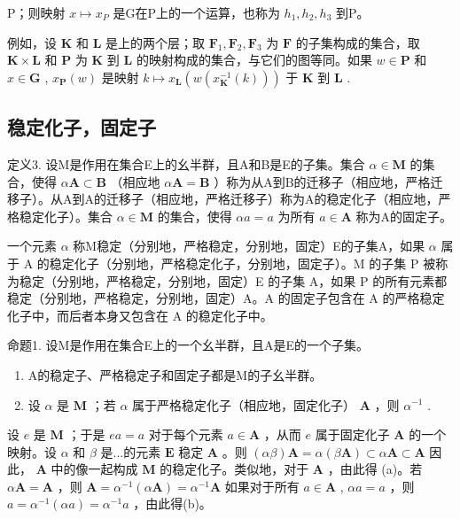 P；则映射 \(x \mapsto x_{P}\) 是G在P上的一个运算，也称为 \(h_{1}, h_{2}, h_{3}\) 到P。

例如，设 \(\mathbf{K}\) 和 \(\mathbf{L}\) 是上的两个层；取 \(\mathbf{F}_1, \mathbf{F}_2, \mathbf{F}_3\) 为 \(\mathbf{F}\) 的子集构成的集合，取 \(\mathbf{K} \times \mathbf{L}\) 和 \(\mathbf{P}\) 为 \(\mathbf{K}\) 到 \(\mathbf{L}\) 的映射构成的集合，与它们的图等同。如果 \(w \in \mathbf{P}\) 和 \(x \in \mathbf{G}\) , \(x_{\mathbf{P}}(w)\) 是映射 \(k \mapsto x_{\mathbf{L}}(w(x_{\mathbf{K}}^{-1}(k)))\) 于 \(\mathbf{K}\) 到 \(\mathbf{L}\) .

\subsection{稳定化子，固定子}

定义3. 设M是作用在集合E上的幺半群，且A和B是E的子集。集合 \(\alpha \in \mathbf{M}\) 的集合，使得 \(\alpha \mathbf{A} \subset \mathbf{B}\) （相应地 \(\alpha \mathbf{A} = \mathbf{B}\) ）称为从A到B的迁移子（相应地，严格迁移子）。从A到A的迁移子（相应地，严格迁移子）称为A的稳定化子（相应地，严格稳定化子）。集合 \(\alpha \in \mathbf{M}\) 的集合，使得 \(\alpha a = a\) 为所有 \(a \in \mathbf{A}\) 称为A的固定子。

一个元素 \(\alpha\) 称M稳定（分别地，严格稳定，分别地，固定）E的子集A，如果 \(\alpha\) 属于 A 的稳定化子（分别地，严格稳定化子，分别地，固定子）。M 的子集 P 被称为稳定（分别地，严格稳定，分别地，固定）E 的子集 A，如果 P 的所有元素都稳定（分别地，严格稳定，分别地，固定）A。A 的固定子包含在 A 的严格稳定化子中，而后者本身又包含在 A 的稳定化子中。

命题1. 设M是作用在集合E上的一个幺半群，且A是E的一个子集。

\begin{enumerate}
\def\labelenumi{(\alph{enumi})}
\item
  A的稳定子、严格稳定子和固定子都是M的子幺半群。
\item
  设 \(\alpha\) 是 \(\mathbf{M}\) ；若 \(\alpha\) 属于严格稳定化子（相应地，固定化子） \(\mathbf{A}\) ，则 \(\alpha^{-1}\) .
\end{enumerate}

设 \(e\) 是 \(\mathbf{M}\) ；于是 \(ea = a\) 对于每个元素 \(a \in \mathbf{A}\) ，从而 \(e\) 属于固定化子 \(\mathbf{A}\) 的一个映射。设 \(\alpha\) 和 \(\beta\) 是...的元素 \(\mathbf{E}\) 稳定 \(\mathbf{A}\) 。则 \((\alpha\beta)\mathbf{A} = \alpha(\beta\mathbf{A}) \subset \alpha\mathbf{A} \subset \mathbf{A}\) 因此， \(\mathbf{A}\) 中的像一起构成 \(\mathbf{M}\) 的稳定化子。类似地，对于 \(\mathbf{A}\) ，由此得 (a)。若 \(\alpha\mathbf{A} = \mathbf{A}\) ，则 \(\mathbf{A} = \alpha^{-1}(\alpha\mathbf{A}) = \alpha^{-1}\mathbf{A}\) 如果对于所有 \(a \in \mathbf{A}\) , \(\alpha a = a\) ，则 \(a = \alpha^{-1}(\alpha a) = \alpha^{-1}a\) ，由此得(b)。

